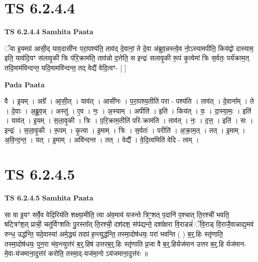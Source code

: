 \documentclass[17pt]{extarticle}
\begin{document}
\section*{ TS 6.2.4.4 }

\textbf{TS 6.2.4.4 } \newline
\textbf{Samhita Paata} \newline

ॅवा इ॒यमग्र॑ आसी॒द् याव॒दासी॑नः परा॒पश्य॑ति॒ ताव॑द् दे॒वानां॒ ते दे॒वा अ॑ब्रुव॒न्नस्त्वे॒व नो॒ऽस्यामपीति॒ किय॑द्वो दास्याम॒ इति॒ याव॑दि॒यꣳ स॑लावृ॒की त्रिः प॑रि॒क्राम॑ति॒ ताव॑न्नो द॒त्तेति॒ स इन्द्रः॑ सलावृ॒की रू॒पं कृ॒त्वेमां त्रिः स॒र्वतः॒ पर्य॑क्राम॒त् तदि॒माम॑विन्दन्त॒ यदि॒मामवि॑न्दन्त॒ तद् वेद्यै॑ वेदि॒त्वꣳ- [  ] \newline

\textbf{Pada Paata} \newline

वै । इ॒यम् । अग्रे᳚ । आ॒सी॒त् । याव॑त् । आसी॑नः । प॒रा॒पश्य॒तीति॑ परा - पश्य॑ति । ताव॑त् । दे॒वाना᳚म् । ते । दे॒वाः । अ॒ब्रु॒व॒न्न् । अस्तु॑ । ए॒व । नः॒ । अ॒स्याम् । अपीति॑ । इति॑ । किय॑त् । वः॒ । दा॒स्या॒मः॒ । इति॑ । याव॑त् । इ॒यम् । स॒ला॒वृ॒की । त्रिः । प॒रि॒क्राम॒तीति॑ परि-क्राम॑ति । ताव॑त् । नः॒ । द॒त्त॒ । इति॑ । सः । इन्द्रः॑ । स॒ला॒वृ॒की । रू॒पम् । कृ॒त्वा । इ॒माम् । त्रिः । स॒र्वतः॑ । परीति॑ । अ॒क्रा॒म॒त् । तत् । इ॒माम् । अ॒वि॒न्द॒न्त॒ । यत् । इ॒माम् । अवि॑न्दन्त । तत् । वेद्यै᳚ । वे॒दि॒त्वमिति॑ वेदि - त्वम् ।  \newline




\section*{ TS 6.2.4.5 }

\textbf{TS 6.2.4.5 } \newline
\textbf{Samhita Paata} \newline

सा वा इ॒यꣳ सर्वै॒व वेदि॒रिय॑ति शक्ष्या॒मीति॒ त्वा अ॑व॒माय॑ यजन्ते त्रिꣳ॒॒शत् प॒दानि॑ प॒श्चात् ति॒रश्ची॑ भवति॒ षट्त्रिꣳ॑श॒त् प्राची॒ चतु॑र्विꣳशतिः पु॒रस्ता᳚त् ति॒रश्ची॒ दश॑दश॒ संप॑द्यन्ते॒ दशा᳚क्षरा वि॒राडन्नं॑ ॅवि॒राड् वि॒राजै॒वान्नाद्य॒मव॑ रुन्ध॒ उद्ध॑न्ति॒ यदे॒वास्या॑ अमे॒द्ध्यं तदप॑ ह॒न्त्युद्ध॑न्ति॒ तस्मा॒दोष॑धयः॒ परा॑ भवन्ति ( ) ब॒र्॒.हिः स्तृ॑णाति॒ तस्मा॒दोष॑धयः॒ पुन॒रा भ॑व॒न्त्युत्त॑रं ब॒र्॒.हिष॑ उत्तरब॒र्॒.हिः स्तृ॑णाति प्र॒जा वै ब॒र्॒.हिर्यज॑मान उत्तर ब॒र्॒.हि र्यज॑मान-मे॒वा-य॑जमाना॒दुत्त॑रं करोति॒ तस्मा॒द्-यज॑मा॒नो ऽय॑जमाना॒दुत्त॑रः ॥ \newline
\end{document}
